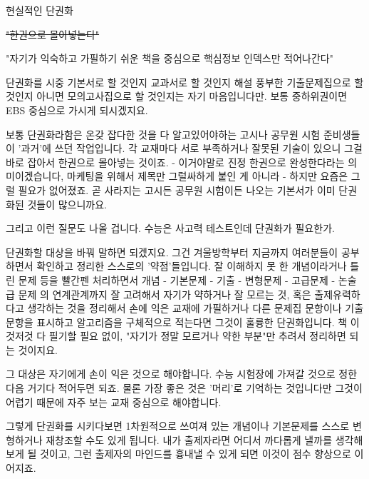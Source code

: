 \vspace{5mm}

현실적인 단권화
\vspace{5mm}

\sout{"한권으로 몰아넣는다"}

"자기가 익숙하고 가필하기 쉬운 책을 중심으로 핵심정보 인덱스만 적어나간다"
\vspace{5mm}

단권화를
시중 기본서로 할 것인지
교과서로 할 것인지
해설 풍부한 기출문제집으로 할 것인지
아니면 모의고사집으로 할 것인지는 자기 마음입니다만.
보통 중하위권이면 EBS 중심으로 가시게 되시겠지요.
\vspace{5mm}

보통 단권화라함은 온갖 잡다한 것을 다 알고있어야하는 고시나 공무원 시험 준비생들이 '과거'에 쓰던 작업입니다.
각 교재마다 서로 부족하거나 잘못된 기술이 있으니 그걸 바로 잡아서 한권으로 몰아넣는 것이죠.
- 이거야말로 진정 한권으로 완성한다라는 의미이겠습니다, 마케팅을 위해서 제목만 그럴싸하게 붙인 게 아니라 -
하지만 요즘은 그럴 필요가 없어졌죠. 곧 사라지는 고시든 공무원 시험이든 나오는 기본서가 이미 단권화된 것들이 많으니까요.
\vspace{5mm}

그리고 이런 질문도 나올 겁니다. 수능은 사고력 테스트인데 단권화가 필요한가.
\vspace{5mm}

단권화할 대상을 바꿔 말하면 되겠지요.
그건 겨울방학부터 지금까지 여러분들이 공부하면서 확인하고 정리한 스스로의 '약점'들입니다.
잘 이해하지 못 한 개념이라거나 틀린 문제 등을 빨간펜 처리하면서
개념 - 기본문제 - 기출 - 변형문제 - 고급문제 - 논술급 문제
의 연계관계까지 잘 고려해서 자기가 약하거나 잘 모르는 것, 혹은 출제유력하다고 생각하는 것을 정리해서
손에 익은 교재에 가필하거나 다른 문제집 문항이나 기출문항을 표시하고 알고리즘을 구체적으로 적는다면 그것이 훌륭한 단권화입니다.
책 이것저것 다 필기할 필요 없이, "자기가 정말 모르거나 약한 부분"만 추려서 정리하면 되는 것이지요.
\vspace{5mm}

그 대상은 자기에게 손이 익은 것으로 해야합니다.
수능 시험장에 가져갈 것으로 정한 다음 거기다 적어두면 되죠.
물론 가장 좋은 것은 '머리'로 기억하는 것입니다만 그것이 어렵기 때문에 자주 보는 교재 중심으로 해야합니다.
\vspace{5mm}

그렇게 단권화를 시키다보면 1차원적으로 쓰여져 있는 개념이나 기본문제를 스스로 변형하거나 재창조할 수도 있게 됩니다.
내가 출제자라면 어디서 까다롭게 낼까를 생각해보게 될 것이고, 그런 출제자의 마인드를 흉내낼 수 있게 되면 이것이 점수 향상으로 이어지죠.
\vspace{5mm}

